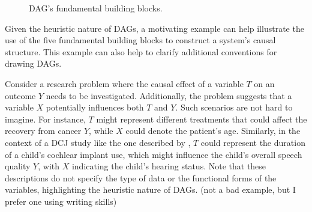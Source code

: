 \documentclass[
  authoryear,
  preprint,
  1p]{elsarticle}
\begin{document}
\begin{figure}
\begin{minipage}{0.33\linewidth}
{}


\end{minipage}%
%
\begin{minipage}{0.33\linewidth}



\end{minipage}%

\caption{\label{fig-dags}DAG's fundamental building blocks.}

\end{figure}%

Given the heuristic nature of DAGs, a motivating example can help
illustrate the use of the five fundamental building blocks to construct
a system's causal structure. This example can also help to clarify
additional conventions for drawing DAGs.

Consider a research problem where the causal effect of a variable \(T\)
on an outcome \(Y\) needs to be investigated. Additionally, the problem
suggests that a variable \(X\) potentially influences both \(T\) and
\(Y\). Such scenarios are not hard to imagine. For instance, \(T\) might
represent different treatments that could affect the recovery from
cancer \(Y\), while \(X\) could denote the patient's age. Similarly, in
the context of a DCJ study like the one described by
\citet{Boonen_et_al_2020}, \(T\) could represent the duration of a
child's cochlear implant use, which might influence the child's overall
speech quality \(Y\), with \(X\) indicating the child's hearing status.
Note that these descriptions do not specify the type of data or the
functional forms of the variables, highlighting the heuristic nature of
DAGs. {(not a bad example, but I prefer one using writing skills)}
\end{document}
